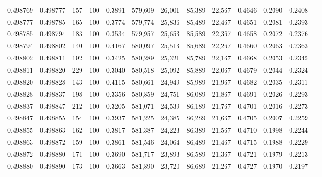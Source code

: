 \begin{tabular}{rrrrrrrrrrrrr}
0.498769 & 0.498777 &   157 & 100 &                                     0.3891 & 579,609 &  26,001 &  85,389 &  22,567 & 0.4646 & 0.2090 & 0.2408 \\
0.498777 & 0.498785 &   165 & 100 &                                     0.3774 & 579,774 &  25,836 &  85,489 &  22,467 & 0.4651 & 0.2081 & 0.2393 \\
0.498785 & 0.498794 &   183 & 100 &                                     0.3534 & 579,957 &  25,653 &  85,589 &  22,367 & 0.4658 & 0.2072 & 0.2376 \\
0.498794 & 0.498802 &   140 & 100 &                                     0.4167 & 580,097 &  25,513 &  85,689 &  22,267 & 0.4660 & 0.2063 & 0.2363 \\
0.498802 & 0.498811 &   192 & 100 &                                     0.3425 & 580,289 &  25,321 &  85,789 &  22,167 & 0.4668 & 0.2053 & 0.2345 \\
0.498811 & 0.498820 &   229 & 100 &                                     0.3040 & 580,518 &  25,092 &  85,889 &  22,067 & 0.4679 & 0.2044 & 0.2324 \\
0.498820 & 0.498828 &   143 & 100 &                                     0.4115 & 580,661 &  24,949 &  85,989 &  21,967 & 0.4682 & 0.2035 & 0.2311 \\
0.498828 & 0.498837 &   198 & 100 &                                     0.3356 & 580,859 &  24,751 &  86,089 &  21,867 & 0.4691 & 0.2026 & 0.2293 \\
0.498837 & 0.498847 &   212 & 100 &                                     0.3205 & 581,071 &  24,539 &  86,189 &  21,767 & 0.4701 & 0.2016 & 0.2273 \\
0.498847 & 0.498855 &   154 & 100 &                                     0.3937 & 581,225 &  24,385 &  86,289 &  21,667 & 0.4705 & 0.2007 & 0.2259 \\
0.498855 & 0.498863 &   162 & 100 &                                     0.3817 & 581,387 &  24,223 &  86,389 &  21,567 & 0.4710 & 0.1998 & 0.2244 \\
0.498863 & 0.498872 &   159 & 100 &                                     0.3861 & 581,546 &  24,064 &  86,489 &  21,467 & 0.4715 & 0.1988 & 0.2229 \\
0.498872 & 0.498880 &   171 & 100 &                                     0.3690 & 581,717 &  23,893 &  86,589 &  21,367 & 0.4721 & 0.1979 & 0.2213 \\
0.498880 & 0.498890 &   173 & 100 &                                     0.3663 & 581,890 &  23,720 &  86,689 &  21,267 & 0.4727 & 0.1970 & 0.2197 \\

\end{tabular}
